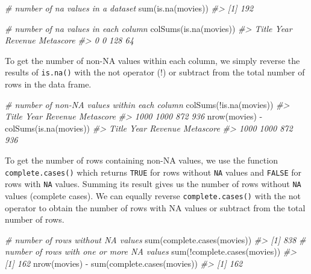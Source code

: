 \documentclass[
]{book}
\newenvironment{Shaded}{\begin{snugshade}}{\end{snugshade}}
\newcommand{\CommentTok}[1]{\textcolor[rgb]{0.56,0.35,0.01}{\textit{#1}}}
\newcommand{\FunctionTok}[1]{\textcolor[rgb]{0.00,0.00,0.00}{#1}}
\newcommand{\NormalTok}[1]{#1}
\newcommand{\SpecialCharTok}[1]{\textcolor[rgb]{0.00,0.00,0.00}{#1}}
\begin{document}
\begin{Shaded}
\begin{Highlighting}[]
\CommentTok{\# number of na values in a dataset}
\FunctionTok{sum}\NormalTok{(}\FunctionTok{is.na}\NormalTok{(movies))}
\CommentTok{\#\textgreater{} [1] 192}

\CommentTok{\# number of na values in each column}
\FunctionTok{colSums}\NormalTok{(}\FunctionTok{is.na}\NormalTok{(movies))}
\CommentTok{\#\textgreater{}     Title      Year   Revenue Metascore }
\CommentTok{\#\textgreater{}         0         0       128        64}
\end{Highlighting}
\end{Shaded}

To get the number of non-NA values within each column, we simply reverse the results of \texttt{is.na()} with the not operator (!) or subtract from the total number of rows in the data frame.

\begin{Shaded}
\begin{Highlighting}[]
\CommentTok{\# number of non{-}NA values within each column}
\FunctionTok{colSums}\NormalTok{(}\SpecialCharTok{!}\FunctionTok{is.na}\NormalTok{(movies))}
\CommentTok{\#\textgreater{}     Title      Year   Revenue Metascore }
\CommentTok{\#\textgreater{}      1000      1000       872       936}
\FunctionTok{nrow}\NormalTok{(movies) }\SpecialCharTok{{-}} \FunctionTok{colSums}\NormalTok{(}\FunctionTok{is.na}\NormalTok{(movies))}
\CommentTok{\#\textgreater{}     Title      Year   Revenue Metascore }
\CommentTok{\#\textgreater{}      1000      1000       872       936}
\end{Highlighting}
\end{Shaded}

To get the number of rows containing non-NA values, we use the function \texttt{complete.cases()} which returns \texttt{TRUE} for rows without \texttt{NA} values and \texttt{FALSE} for rows with \texttt{NA} values. Summing its result gives us the number of rows without \texttt{NA} values (complete cases). We can equally reverse \texttt{complete.cases()} with the not operator to obtain the number of rows with NA values or subtract from the total number of rows.

\begin{Shaded}
\begin{Highlighting}[]
\CommentTok{\# number of rows without NA values}
\FunctionTok{sum}\NormalTok{(}\FunctionTok{complete.cases}\NormalTok{(movies))}
\CommentTok{\#\textgreater{} [1] 838}
\CommentTok{\# number of rows with one or more NA values}
\FunctionTok{sum}\NormalTok{(}\SpecialCharTok{!}\FunctionTok{complete.cases}\NormalTok{(movies))}
\CommentTok{\#\textgreater{} [1] 162}
\FunctionTok{nrow}\NormalTok{(movies) }\SpecialCharTok{{-}} \FunctionTok{sum}\NormalTok{(}\FunctionTok{complete.cases}\NormalTok{(movies))}
\CommentTok{\#\textgreater{} [1] 162}
\end{Highlighting}
\end{Shaded}
\end{document}
